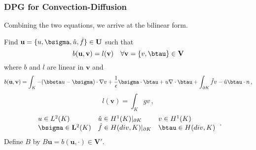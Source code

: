  \begin{frame}
 \frametitle{DPG for Convection-Diffusion}
 Combining the two equations, we arrive at the bilinear form.
 \bigskip
 
 Find $\mathbf{u}=\{u,\bsigma,\hat u,\hat f\}\in\mathbf{U}$
 such that
 \[
 b(\mathbf{u},\mathbf{v}) =
 l(\mathbf{v})\quad\forall\mathbf{v}=\{v,\btau\}\in\mathbf{V}
 \]
 where $b$ and $l$ are linear in $\mathbf{v}$ and
 \[
 b(\mathbf{u},\mathbf{v}) =
 \int_K-(\bbeta u-\bsigma)\cdot\nabla v+\frac{1}{\epsilon}\bsigma\cdot\btau+u\nabla\cdot\btau
 +\int_{\partial K}\hat f v-\hat u\btau\cdot n\,,
 \]
 \[
 l(\mathbf{v})=\int_K gv\,,
 \]
 \[
 \begin{array}{lll}
 u\in L^2(K) & \hat u\in H^1(K)|_{\partial K} & v\in H^1(K)\\
 \bsigma\in \mathbf{L}^2(K) & \hat f\in H(div,K)|_{\partial K} & \btau\in H(div,K)\\
 \end{array}\,.
 \]
 Define $B$ by $B\mathbf{u}=b(\mathbf{u},\cdot)\in\mathbf{V}'$.
 \end{frame}

